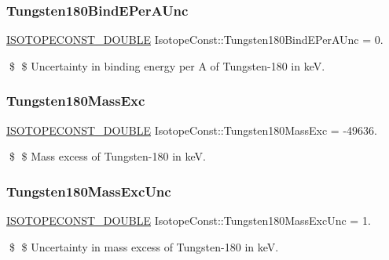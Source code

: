 \subsubsection{\texorpdfstring{Tungsten180\+Bind\+E\+Per\+A\+Unc}{Tungsten180BindEPerAUnc}}
{\footnotesize\ttfamily \mbox{\hyperlink{group___isotope_const-_macros_ga8f45a7272ce02c0b4c65c44636ed719a}{I\+S\+O\+T\+O\+P\+E\+C\+O\+N\+S\+T\+\_\+\+D\+O\+U\+B\+LE}} Isotope\+Const\+::\+Tungsten180\+Bind\+E\+Per\+A\+Unc = 0.}

\$ \$ Uncertainty in binding energy per A of Tungsten-\/180 in keV. \mbox{\label{group___isotope_const-_tungsten-_w180_ga1ffe7adea8860fd70c7cd7e3ef1ffeab}} 
\subsubsection{\texorpdfstring{Tungsten180\+Mass\+Exc}{Tungsten180MassExc}}
{\footnotesize\ttfamily \mbox{\hyperlink{group___isotope_const-_macros_ga8f45a7272ce02c0b4c65c44636ed719a}{I\+S\+O\+T\+O\+P\+E\+C\+O\+N\+S\+T\+\_\+\+D\+O\+U\+B\+LE}} Isotope\+Const\+::\+Tungsten180\+Mass\+Exc = -\/49636.}

\$ \$ Mass excess of Tungsten-\/180 in keV. \mbox{\label{group___isotope_const-_tungsten-_w180_ga34a37ff428425821169402039baacafa}} 
\subsubsection{\texorpdfstring{Tungsten180\+Mass\+Exc\+Unc}{Tungsten180MassExcUnc}}
{\footnotesize\ttfamily \mbox{\hyperlink{group___isotope_const-_macros_ga8f45a7272ce02c0b4c65c44636ed719a}{I\+S\+O\+T\+O\+P\+E\+C\+O\+N\+S\+T\+\_\+\+D\+O\+U\+B\+LE}} Isotope\+Const\+::\+Tungsten180\+Mass\+Exc\+Unc = 1.}

\$ \$ Uncertainty in mass excess of Tungsten-\/180 in keV. \mbox{\label{group___isotope_const-_tungsten-_w180_ga4a32c21c126fea2022324bc6f21482a7}} 
